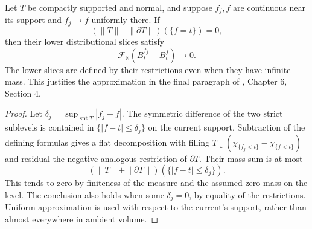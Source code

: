 \begin{lemma}\label{lem:slice-function-uniform-limit}
Let $T$ be compactly supported and normal, and suppose $f_j,f$ are continuous near its support and $f_j\to f$ uniformly there. If
\[
 (\|T\|+\|\partial T\|)(\{f=t\})=0,
\]
then their lower distributional slices satisfy
\[
 \mathcal F_{\mathbb R}(B_t^{f_j}-B_t^f)\longrightarrow0.
\]
The lower slices are defined by their restrictions even when they have infinite mass. This justifies the approximation in the final paragraph of \cite{Sim18}, Chapter 6, Section 4.
\end{lemma}
\begin{proof}
Let $\delta_j=\sup_{\operatorname{spt}T}|f_j-f|$. The symmetric difference of the two strict sublevels is contained in $\{|f-t|\leq\delta_j\}$ on the current support. Subtraction of the defining formulas gives a flat decomposition with filling
$T\llcorner(\chi_{\{f_j<t\}}-\chi_{\{f<t\}})$
and residual the negative analogous restriction of $\partial T$. Their mass sum is at most
\[
 (\|T\|+\|\partial T\|)(\{|f-t|\leq\delta_j\}).
\]
This tends to zero by finiteness of the measure and the assumed zero mass on the level. The conclusion also holds when some $\delta_j=0$, by equality of the restrictions. Uniform approximation is used with respect to the current's support, rather than almost everywhere in ambient volume.
\end{proof}

